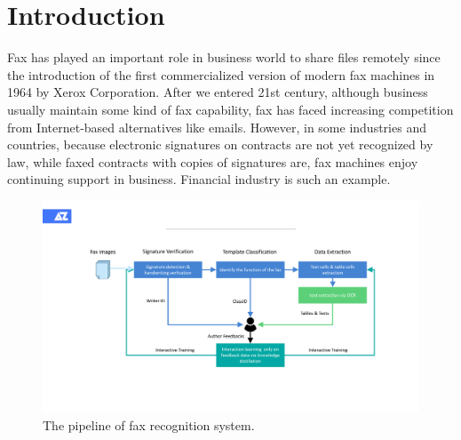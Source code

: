 \documentclass[sigconf]{acmart}
\begin{document}
%


%
\maketitle

\section{Introduction}
Fax has played an important role in business world to share files remotely since the introduction of the first commercialized version of modern fax machines in 1964 by Xerox Corporation. After we entered 21st century, although business usually maintain some kind of fax capability, fax has faced increasing competition from Internet-based alternatives like emails. However, in some industries and countries, because electronic signatures on contracts are not yet recognized by law, while faxed contracts with copies of signatures are, fax machines enjoy continuing support in business. Financial industry is such an example.


\begin{figure}[h]
	\centering
	\includegraphics[width=\linewidth]{figure1}
	\caption{The pipeline of fax recognition system. }
	\label{figure1}
\end{figure}
\end{document}

